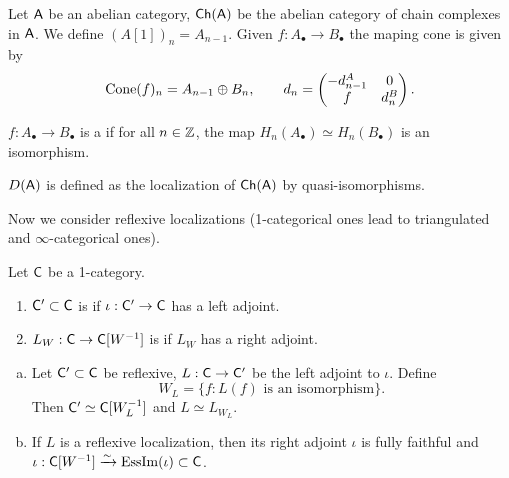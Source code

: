 \begin{example}
	Let $\mathsf{A}$ be an abelian category, $\mathsf{Ch}(\mathsf{A})$ be the abelian category of chain complexes in $\mathsf{A}$. We define $(A[1])_n = A_{n-1}$. Given $f:A_\bullet\to B_\bullet$ the maping cone is given by
	\[
		\operatorname{Cone}(f)_n = A_{n-1} \oplus B_n,\qquad d_n = \begin{pmatrix} -d_{n-1}^{A} & 0 \\ f & d_n^{B} \end{pmatrix} 
	.\] 
\end{example}
\begin{definition}
	$f:A_\bullet\to B_\bullet$ is a  if for all $n\in \mathbb Z$, the map $H_n(A_\bullet)\simeq H_n(B_\bullet)$ is an isomorphism.
\end{definition}
\begin{definition}
	$D(\mathsf{A})$ is defined as the localization of $\mathsf{Ch}(\mathsf{A})$ by quasi-isomorphisms.
\end{definition}

Now we consider reflexive localizations (1-categorical ones lead to triangulated and $\infty$-categorical ones).
\begin{definition}
	Let $\mathsf{C}$ be a 1-category.
	\begin{enumerate}[1)]
		\item $\mathsf{C}'\subset \mathsf{C}$ is  if $\iota:\C'\to \C$ has a left adjoint.
		\item $L_W:\C\to \C[W^{-1}]$ is  if $L_W$ has a right adjoint.
	\end{enumerate}
\end{definition}

\begin{lemma} \leavevmode
	\begin{enumerate}[a)]
		\item Let $\mathsf{C}'\subset \mathsf{C}$ be reflexive, $L:\C\to \C'$ be the left adjoint to $\iota$. Define 
			\[
				W_L=\{f:L(f)\text{ is an isomorphism}\}.
			\]
			Then $\mathsf{C}'\simeq \mathsf{C}[W_L^{-1}]$ and $L\simeq L_{W_L}$.
		\item If $L$ is a reflexive localization, then its right adjoint $\iota$ is fully faithful and $\iota:\mathsf{C}[W^{-1}] \xrightarrow{\sim} \operatorname{EssIm}(\iota)\subset \mathsf{C}$.
	\end{enumerate}
\end{lemma}

